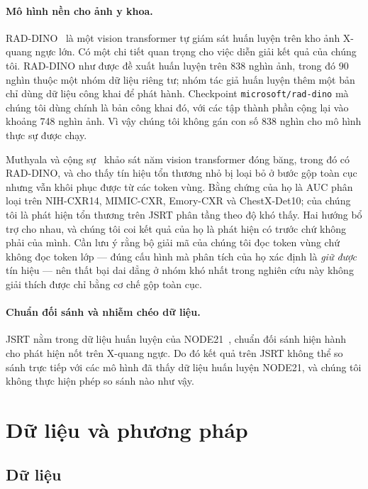 \documentclass[12pt,a4paper]{article}
\begin{document}
\paragraph{Mô hình nền cho ảnh y khoa.}
RAD-DINO~\cite{perezgarcia2024raddino} là một vision transformer tự giám sát
huấn luyện trên kho ảnh X-quang ngực lớn. Có một chi tiết quan trọng cho việc
diễn giải kết quả của chúng tôi. RAD-DINO như được đề xuất huấn luyện trên 838
nghìn ảnh, trong đó 90 nghìn thuộc một nhóm dữ liệu riêng tư; nhóm tác giả huấn
luyện thêm một bản chỉ dùng dữ liệu công khai để phát hành. Checkpoint
\texttt{microsoft/rad-dino} mà chúng tôi dùng chính là bản công khai đó, với các
tập thành phần cộng lại vào khoảng 748 nghìn ảnh. Vì vậy chúng tôi không gán con
số 838 nghìn cho mô hình thực sự được chạy.

Muthyala và cộng sự~\cite{muthyala2026frozen} khảo sát năm vision transformer
đóng băng, trong đó có RAD-DINO, và cho thấy tín hiệu tổn thương nhỏ bị loại bỏ
ở bước gộp toàn cục nhưng vẫn khôi phục được từ các token vùng. Bằng chứng của họ
là AUC phân loại trên NIH-CXR14, MIMIC-CXR, Emory-CXR và ChestX-Det10; của chúng
tôi là phát hiện tổn thương trên JSRT phân tầng theo độ khó thấy. Hai hướng bổ
trợ cho nhau, và chúng tôi coi kết quả của họ là phát hiện có trước chứ không
phải của mình. Cần lưu ý rằng bộ giải mã của chúng tôi đọc token vùng chứ không
đọc token lớp --- đúng cấu hình mà phân tích của họ xác định là \emph{giữ được}
tín hiệu --- nên thất bại dai dẳng ở nhóm khó nhất trong nghiên cứu này không
giải thích được chỉ bằng cơ chế gộp toàn cục.

\paragraph{Chuẩn đối sánh và nhiễm chéo dữ liệu.}
JSRT nằm trong dữ liệu huấn luyện của NODE21~\cite{sogancioglu2024node21}, chuẩn
đối sánh hiện hành cho phát hiện nốt trên X-quang ngực. Do đó kết quả trên JSRT
không thể so sánh trực tiếp với các mô hình đã thấy dữ liệu huấn luyện NODE21,
và chúng tôi không thực hiện phép so sánh nào như vậy.

\section{Dữ liệu và phương pháp}

\subsection{Dữ liệu}
\end{document}
